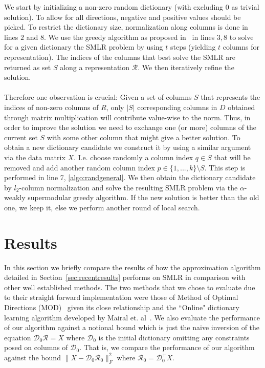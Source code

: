 \documentclass{article}
\newcommand{\Rr}{\mathcal{R}}
\newcommand{\D}{\mathcal{D}}
\begin{document}
\noindent We start by initializing a non-zero random dictionary (with excluding $0$ as trivial solution). To allow for all directions, negative and positive values should be picked. To restrict the dictionary size, normalization along columns is done in lines $2$ and $8$. We use the greedy algorithm as proposed in~\cite{weaklyalpha} in lines $3, 8$ to solve for a given dictionary the SMLR problem by using $t$ steps (yielding $t$ columns for representation). The indices of the columns that best solve the SMLR are returned as set $S$ along a representation $\Rr$. We then iteratively refine the solution.
\\
\\
Therefore one observation is crucial: Given a set of columns $S$ that represents the indices of non-zero columns of $R$, only $|S|$ corresponding columns in $D$ obtained through matrix multiplication will contribute value-wise to the norm. Thus, in order to improve the solution we need to exchange one (or more) columns of the current set $S$ with some other column that might give a better solution. To obtain a new dictionary candidate we construct it by using a similar argument via the data matrix $X$. I.e. choose randomly a column index $q \in S$ that will be removed and add another random column index $p \in \lbrace 1, ..., k \rbrace \setminus S$. This step is performed in line 7, \ref{algo:randgeneral}. We then obtain the dictionary candidate by $l_2$-column normalization and solve the resulting SMLR problem via the $\alpha$-weakly supermodular greedy algorithm. If the new solution is better than the old one, we keep it, else we perform another round of local search.
\section{Results}\label{sec:results}

In this section we briefly compare the results of how the approximation algorithm detailed in Section~\ref{sec:recentresults} performs on SMLR in comparison with other well established methods. The two methods that we chose to evaluate due to their straight forward implementation were those of Method of Optimal Directions (MOD)~\cite{MOD} given its close relationship and the ``Online" dictionary learning algorithm developed by Mairal et. al~\cite{mairal09}. We also evaluate the performance of our algorithm against a notional bound which is just the naive inversion of the equation $\D_0\Rr = X$ where $\D_0$ is the initial dictionary omitting any constraints posed on columns of $\D_0$. That is, we compare the performance of our algorithm against the bound $\|X-\D_0\Rr_0\|_F^2$ where $\Rr_0 = \D_0^+ X$.
\end{document}

